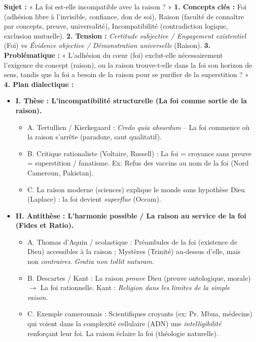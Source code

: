 \documentclass[11pt]{article}
\newcommand{\cle}[1]{{\popxbold\color{popdark}#1}}
\begin{document}
\begin{exoresolu}
\textbf{Sujet :} « La foi est-elle incompatible avec la raison ? »
\tcblower
\textbf{1. Concepts clés :} \cle{Foi} (adhésion libre à l'invisible, confiance, don de soi), \cle{Raison} (faculté de connaître par concepts, preuve, universalité), \cle{Incompatibilité} (contradiction logique, exclusion mutuelle).
\textbf{2. Tension :} \emph{Certitude subjective / Engagement existentiel} (Foi) vs \emph{Évidence objective / Démonstration universelle} (Raison).
\textbf{3. Problématique :} « L'adhésion du cœur (foi) exclut-elle nécessairement l'exigence du concept (raison), ou la raison trouve-t-elle dans la foi son horizon de sens, tandis que la foi a besoin de la raison pour se purifier de la superstition ? »
\textbf{4. Plan dialectique :}
\begin{itemize}
    \item \textbf{I. Thèse : L'incompatibilité structurelle (La foi comme sortie de la raison).}
    \begin{itemize}
        \item A. Tertullien / Kierkegaard : \emph{Credo quia absurdum} -- La foi commence où la raison s'arrête (paradoxe, saut qualitatif).
        \item B. Critique rationaliste (Voltaire, Russell) : La foi = croyance sans preuve = superstition / fanatisme. Ex: Refus des vaccins au nom de la foi (Nord Cameroun, Pakistan).
        \item C. La raison moderne (sciences) explique le monde sans hypothèse Dieu (Laplace) : la foi devient \emph{superflue} (Occam).
    \end{itemize}
    \item \textbf{II. Antithèse : L'harmonie possible / La raison au service de la foi (Fides et Ratio).}
    \begin{itemize}
        \item A. Thomas d'Aquin / scolastique : \cle{Préambules de la foi} (existence de Dieu) accessibles à la raison ; \cle{Mystères} (Trinité) au-dessus d'elle, mais non \emph{contraires}. \emph{Gratia non tollit naturam}.
        \item B. Descartes / Kant : La raison \emph{prouve} Dieu (preuve ontologique, morale) $\rightarrow$ La foi rationnelle. Kant : \emph{Religion dans les limites de la simple raison}.
        \item C. Exemple camerounais : Scientifiques croyants (ex: Pr. Mbua, médecins) qui voient dans la complexité cellulaire (ADN) une \emph{intelligibilité} renforçant leur foi. La raison éclaire la foi (théologie naturelle).

\end{itemize}
\end{itemize}
\end{exoresolu}
\end{document}
